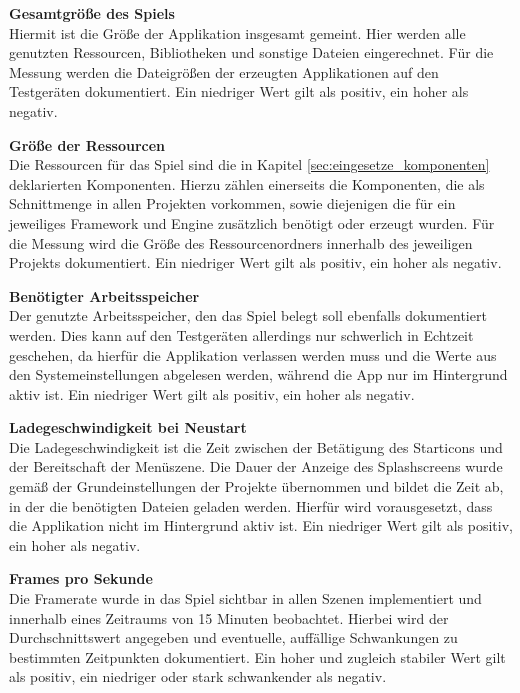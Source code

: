 \bigskip
\textbf{Gesamtgröße des Spiels} \\
Hiermit ist die Größe der Applikation insgesamt gemeint. Hier werden alle genutzten Ressourcen, Bibliotheken und sonstige Dateien eingerechnet. Für die Messung werden die Dateigrößen der erzeugten Applikationen auf den Testgeräten dokumentiert. Ein niedriger Wert gilt als positiv, ein hoher als negativ.


\bigskip
\textbf{Größe der Ressourcen} \\
Die Ressourcen für das Spiel sind die in Kapitel \ref{sec:eingesetze_komponenten} deklarierten Komponenten. Hierzu zählen einerseits die Komponenten, die als Schnittmenge in allen Projekten vorkommen, sowie diejenigen die für ein jeweiliges Framework und Engine zusätzlich benötigt oder erzeugt wurden. Für die Messung wird die Größe des Ressourcenordners innerhalb des jeweiligen Projekts dokumentiert. Ein niedriger Wert gilt als positiv, ein hoher als negativ.

\bigskip
\textbf{Benötigter Arbeitsspeicher} \\
Der genutzte Arbeitsspeicher, den das Spiel belegt soll ebenfalls dokumentiert werden. Dies kann auf den Testgeräten allerdings nur schwerlich in Echtzeit geschehen, da hierfür die Applikation verlassen werden muss und die Werte aus den Systemeinstellungen abgelesen werden, während die App nur im Hintergrund aktiv ist. Ein niedriger Wert gilt als positiv, ein hoher als negativ.

\bigskip
\textbf{Ladegeschwindigkeit bei Neustart} \\
Die Ladegeschwindigkeit ist die Zeit zwischen der Betätigung des Starticons und der Bereitschaft der Menüszene. Die Dauer der Anzeige des Splashscreens wurde gemäß der Grundeinstellungen der Projekte übernommen und bildet die Zeit ab, in der die benötigten Dateien geladen werden. Hierfür wird vorausgesetzt, dass die Applikation nicht im Hintergrund aktiv ist. Ein niedriger Wert gilt als positiv, ein hoher als negativ.

\bigskip
\textbf{Frames pro Sekunde} \\
Die Framerate wurde in das Spiel sichtbar in allen Szenen implementiert und innerhalb eines Zeitraums von 15 Minuten beobachtet. Hierbei wird der Durchschnittswert angegeben und eventuelle, auffällige Schwankungen zu bestimmten Zeitpunkten dokumentiert. Ein hoher und zugleich stabiler Wert gilt als positiv, ein niedriger oder stark schwankender als negativ.

